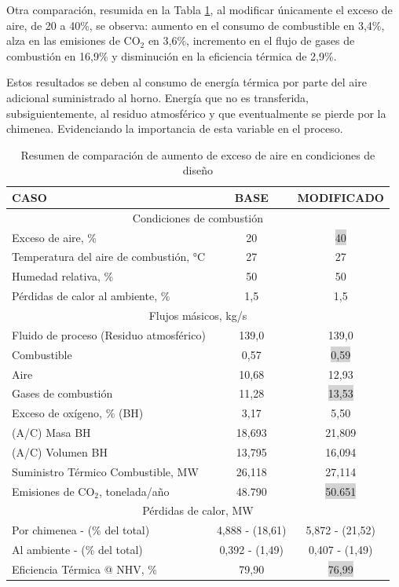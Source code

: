 \par Otra comparación, resumida en la Tabla \ref{tbl:comparison-air}, al modificar únicamente el exceso de aire, de 20 a 40\%, se observa: aumento en el consumo de combustible en 3,4\%, alza en las emisiones de CO$_2$ en 3,6\%, incremento en el flujo de gases de combustión en 16,9\% y disminución en la eficiencia térmica de 2,9\%. 
\par Estos resultados se deben al consumo de energía térmica por parte del aire adicional suministrado al horno. Energía que no es transferida, subsiguientemente, al residuo atmosférico y que eventualmente se pierde por la chimenea. Evidenciando la importancia de esta variable en el proceso.
\begin{table}[H]
\caption{Resumen de comparación de aumento de exceso de aire en condiciones de diseño}
\label{tbl:comparison-air} \centering \begin{tabular}{l|c|c}
\quad\quad\quad CASO & BASE & MODIFICADO \\
\hline
\multicolumn{3}{c}{Condiciones de combustión} \\
Exceso de aire, \%      &20  &\colorbox{lightgray}{40}\\
Temperatura del aire de combustión, °C  &27     &27   \\
Humedad relativa, \%                    &50     &50   \\
Pérdidas de calor al ambiente, \%       &1,5    &1,5  \\
\multicolumn{3}{c}{Flujos másicos,  kg/s} \\
Fluido de proceso (Residuo atmosférico)   &139,0         &139,0  \\
Combustible           &0,57  &\colorbox{lightgray}{0,59} \\
Aire                  &10,68 & 12,93  \\
Gases de combustión   &11,28 &\colorbox{lightgray}{13,53}  \\
\hline
Exceso de oxígeno, \% (BH) &3,17   &5,50   \\
(A/C) Masa BH              &18,693 &21,809 \\
(A/C) Volumen BH           &13,795 &16,094  \\
\hline
Suministro Térmico Combustible,  MW  &26,118 &27,114 \\
\hline
Emisiones de CO$_2$, tonelada/año &48.790  &\colorbox{lightgray}{50.651} \\
\hline
\multicolumn{3}{c}{Pérdidas de calor,  MW}\\
Por chimenea - (\% del total)&4,888 - (18,61) &5,872 - (21,52) \\
Al ambiente - (\% del total) &0,392 - (1,49)  &0,407 - (1,49) \\
\hline
Eficiencia Térmica @ NHV, \%  &79,90 &\colorbox{lightgray}{76,99} \\
\end{tabular} \end{table}